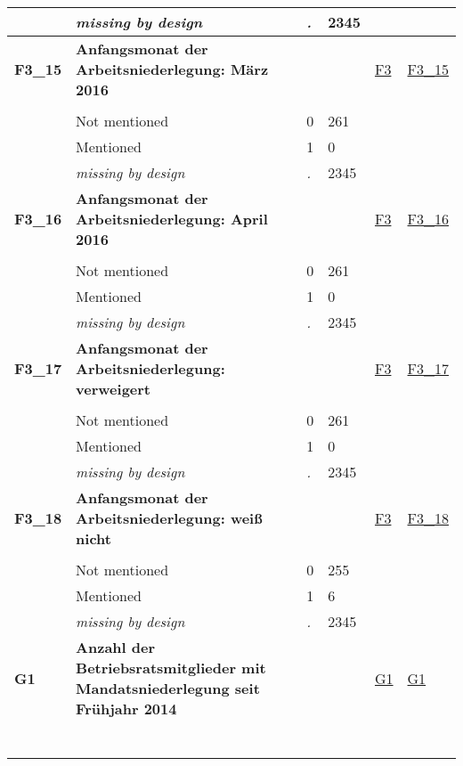 \begin{longtable}{| L{2.45cm} | L{6cm} | C{1.5cm} | R{1cm} | C{2.25cm} | C{2.25cm} |}
   & \textit{missing by design} & \textit{.} & 2345 &  &  \\ 
   \midrule
\textbf{F3\_15}\label{var:F3:15} & \textbf{Anfangsmonat der Arbeitsniederlegung: März 2016} &  &  & \hyperref[F3]{F3} & \hyperref[var:suf:F3:15]{F3\_15} \\ 
   &  &  &  &  &  \\ 
   & Not mentioned & 0 & 261 &  &  \\ 
   & Mentioned & 1 & 0 &  &  \\ 
   & \textit{missing by design} & \textit{.} & 2345 &  &  \\ 
   \midrule
\textbf{F3\_16}\label{var:F3:16} & \textbf{Anfangsmonat der Arbeitsniederlegung: April 2016} &  &  & \hyperref[F3]{F3} & \hyperref[var:suf:F3:16]{F3\_16} \\ 
   &  &  &  &  &  \\ 
   & Not mentioned & 0 & 261 &  &  \\ 
   & Mentioned & 1 & 0 &  &  \\ 
   & \textit{missing by design} & \textit{.} & 2345 &  &  \\ 
   \midrule
\textbf{F3\_17}\label{var:F3:17} & \textbf{Anfangsmonat der Arbeitsniederlegung: verweigert} &  &  & \hyperref[F3]{F3} & \hyperref[var:suf:F3:17]{F3\_17} \\ 
   &  &  &  &  &  \\ 
   & Not mentioned & 0 & 261 &  &  \\ 
   & Mentioned & 1 & 0 &  &  \\ 
   & \textit{missing by design} & \textit{.} & 2345 &  &  \\ 
   \midrule
\textbf{F3\_18}\label{var:F3:18} & \textbf{Anfangsmonat der Arbeitsniederlegung: weiß nicht} &  &  & \hyperref[F3]{F3} & \hyperref[var:suf:F3:18]{F3\_18} \\ 
   &  &  &  &  &  \\ 
   & Not mentioned & 0 & 255 &  &  \\ 
   & Mentioned & 1 & 6 &  &  \\ 
   & \textit{missing by design} & \textit{.} & 2345 &  &  \\ 
   \midrule
\textbf{G1}\label{var:G1} & \textbf{Anzahl der Betriebsratsmitglieder mit Mandatsniederlegung seit Frühjahr 2014} &  &  & \hyperref[G1]{G1} & \hyperref[var:suf:G1]{G1} \\ 
   & \protect\subsection[Variablen G1 bis G15]{} &  &  &  &  \\ 

\end{longtable}
